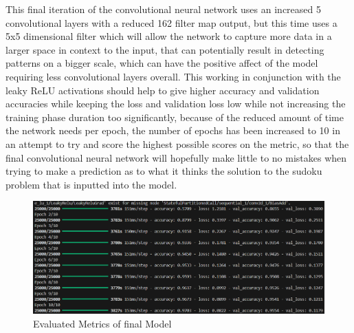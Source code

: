 \documentclass[]{final_report}
\begin{document}
This final iteration of the convolutional neural network uses an increased 5 convolutional layers with a reduced 162 filter map output, but this time uses a 5x5 dimensional filter which will allow the network to capture more data in a larger space in context to the input, that can potentially result in detecting patterns on a bigger scale, which can have the positive affect of the model requiring less convolutional layers overall. This working in conjunction with the leaky ReLU activations should help to give higher accuracy and validation accuracies while keeping the loss and validation loss low while not increasing the training phase duration too significantly, because of the reduced amount of time the network needs per epoch, the number of epochs has been increased to 10 in an attempt to try and score the highest possible scores on the metric, so that the final convolutional neural network will hopefully make little to no mistakes when trying to make a prediction as to what it thinks the solution to the sudoku problem that is inputted into the model.

\begin{figure}[ht]
    \centering 
    \begin{minipage}{1.1\textwidth} 
        \includegraphics[width=\textwidth]{images/final model metrics.png} 
        \caption{Evaluated Metrics of final Model}
        \label{fig: Evaluated Metrics of final Model} 
    \end{minipage} 
    \hfill 
\end{figure}
\end{document}
